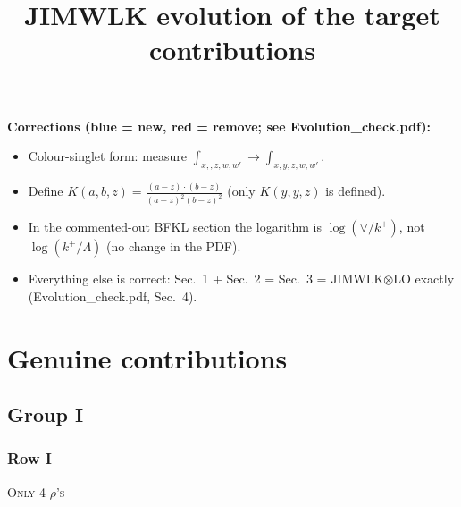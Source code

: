 \documentclass[9pt]{article}
\title{JIMWLK evolution of the target contributions}
\author{}
\date{}
\numberwithin{equation}{section}
\begin{document}
\maketitle
{\color{blue}\noindent\textbf{Corrections (blue = new, red = remove; see Evolution\_check.pdf):}
\begin{itemize}
\item Colour-singlet form: measure $\int_{x,,z,w,w'}\to\int_{x,y,z,w,w'}$.
\item Define $K(a,b,z)=\frac{(a-z)\cdot(b-z)}{(a-z)^{2}(b-z)^{2}}$ (only $K(y,y,z)$ is defined).
\item In the commented-out BFKL section the logarithm is $\log(\vee/k^+)$, not $\log(k^+/\Lambda)$ (no change in the PDF).
\item Everything else is correct: Sec.~1 + Sec.~2 = Sec.~3 = JIMWLK$\otimes$LO exactly (Evolution\_check.pdf, Sec.~4).
\end{itemize}}

\section{Genuine contributions}
\subsection{Group I}
\subsubsection{Row I}
\textsc{Only 4 $\rho$'s}
\end{document}
